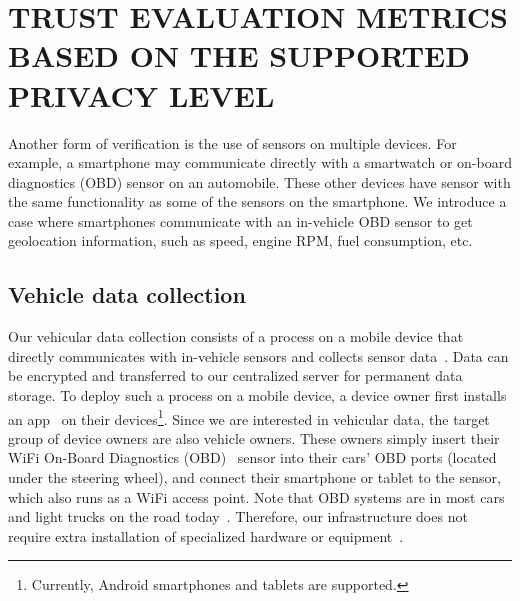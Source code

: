 \section{TRUST EVALUATION METRICS BASED ON THE SUPPORTED PRIVACY LEVEL}
\label{sec:geolocation}
Another form of verification is the use of sensors on multiple devices.  For example,
a smartphone may communicate directly with a smartwatch or on-board diagnostics (OBD)
sensor on an automobile.  These other devices have sensor with the same
functionality as some of the sensors on the smartphone.
We introduce a case where smartphones communicate with an in-vehicle OBD sensor
to get geolocation information, such as speed, engine RPM, fuel consumption, 
etc.

\subsection{Vehicle data collection}

Our vehicular data collection consists of a process on a mobile 
device that directly communicates with in-vehicle sensors and collects sensor 
data~\cite{sensor}. Data can be encrypted and transferred to our 
centralized server for permanent data storage. 
To deploy such a process on a mobile device, a device owner first installs an
app~\cite{sensor-app} on their devices\footnote{Currently, Android smartphones 
and tablets are supported.}. Since we are interested in
vehicular data, the target group of device owners are also vehicle 
owners. These owners simply insert their WiFi On-Board Diagnostics 
(OBD)~\cite{obd} sensor into their cars' OBD ports (located under the steering wheel),  
and connect their 
smartphone or tablet to the sensor, which also runs as a WiFi access 
point. Note that OBD systems are in most cars and light trucks 
on the road today~\cite{obdconnector}. Therefore, our 
infrastructure does not require extra installation of specialized  
hardware or equipment~\cite{reininger2015first}. 

